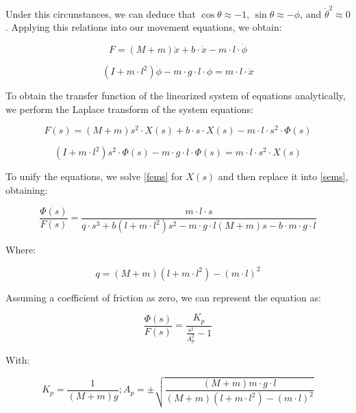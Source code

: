 Under this circunstances, we can deduce that $\cos{\theta}\approx -1$, $\sin{\theta}\approx -\phi$, and $\dot{\theta}^2\approx 0$. Applying this relations into our movement equations, we obtain:

\begin{equation} \label{feml}
	F=(M+m)\ddot{x}+b\cdot \dot{x}-m\cdot l\cdot \ddot{\phi}
\end{equation}

\begin{equation} \label{seml}
	(I+m\cdot l^2)\ddot{\phi}-m\cdot g\cdot l\cdot \phi=m\cdot l\cdot \ddot{x}
\end{equation}

To obtain the transfer function of the linearized system of equations analytically, we perform the Laplace transform of the system equations:

\begin{equation} \label{fems}
	F(s)=(M+m)s^2\cdot X(s)+b\cdot s\cdot X(s)-m\cdot l\cdot s^2\cdot \Phi(s)
\end{equation}

\begin{equation} \label{sems}
	(I+m\cdot l^2)s^2\cdot \Phi(s)-m\cdot g\cdot l\cdot \Phi(s)=m\cdot l\cdot s^2\cdot X(s)
\end{equation}

To unify the equations, we solve \ref{fems} for $X(s)$ and then replace it into \ref{sems}, obtaining:

\begin{equation} \label{ecms}
	\frac{\Phi(s)}{F(s)}=\frac{m\cdot l\cdot s}{q\cdot s^3+b(l+m\cdot l^2)s^2-m\cdot g\cdot l(M+m)s-b\cdot m\cdot g\cdot l}
\end{equation}

Where:

\begin{equation} \label{dq}
	q=(M+m)(l+m\cdot l^2)-(m\cdot l)^2
\end{equation}

Assuming a coefficient of friction as zero, we can represent the equation as:

\begin{equation} \label{efms}
	\frac{\Phi(s)}{F(s)}=\frac{K_p}{\frac{s^2}{A_p^2}-1}
\end{equation}

With:

\begin{equation} \label{dka}
	K_p=\frac{1}{(M+m)g} ; A_p=\pm \sqrt{\frac{(M+m)m\cdot g\cdot l}{(M+m)(l+m\cdot l^2)-(m\cdot l)^2}}
\end{equation}

